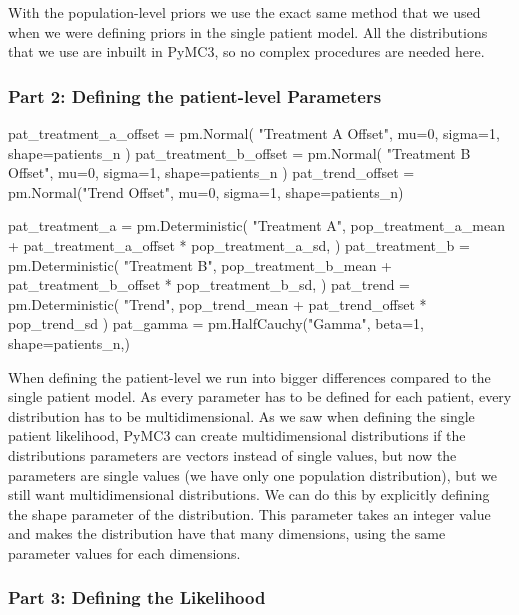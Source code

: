 \documentclass[12pt,a4paper,leqno]{report}
\theoremstyle{plain}
\theoremstyle{definition}
\theoremstyle{remark}
\begin{document}
With the population-level priors we use the exact same method that we used when we were
defining priors in the single patient model. All the distributions that we use are
inbuilt in PyMC3, so no complex procedures are needed here.

\subsubsection*{Part 2: Defining the patient-level Parameters}

\bigskip
\begin{pyverbatim}[][fontsize=\footnotesize]
    pat_treatment_a_offset = pm.Normal(
        "Treatment A Offset", mu=0, sigma=1, shape=patients_n
    )
    pat_treatment_b_offset = pm.Normal(
        "Treatment B Offset", mu=0, sigma=1, shape=patients_n
    )
    pat_trend_offset = pm.Normal("Trend Offset", mu=0, sigma=1, shape=patients_n)

    pat_treatment_a = pm.Deterministic(
        "Treatment A",
        pop_treatment_a_mean + pat_treatment_a_offset * pop_treatment_a_sd,
    )
    pat_treatment_b = pm.Deterministic(
        "Treatment B",
        pop_treatment_b_mean + pat_treatment_b_offset * pop_treatment_b_sd,
    )
    pat_trend = pm.Deterministic(
        "Trend", pop_trend_mean + pat_trend_offset * pop_trend_sd
    )
    pat_gamma = pm.HalfCauchy("Gamma", beta=1, shape=patients_n,)
\end{pyverbatim}
\smallskip


When defining the patient-level we run into bigger differences compared to the single
patient model. As every parameter has to be defined for each patient, every distribution
has to be multidimensional. As we saw when defining the single patient likelihood, PyMC3
can create multidimensional distributions if the distributions parameters are vectors
instead of single values, but now the parameters are single values (we have only one
population distribution), but we still want multidimensional distributions. We can do
this by explicitly defining the shape parameter of the distribution. This parameter
takes an integer value and makes the distribution have that many
dimensions, using the same parameter values for each dimensions.

\subsubsection*{Part 3: Defining the Likelihood}
\end{document}
